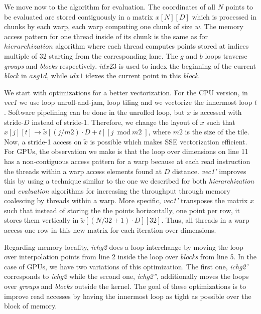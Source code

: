 We move now to the algorithm for evaluation. The coordinates of all $N$ points
to be evaluated are stored contiguously in a matrix $x[N][D]$ which is processed
in chunks by each warp, each warp computing one chunk of size $w$. The memory
access pattern for one thread inside of its chunk is the same as for
$hierarchization$ algorithm where each thread computes points stored at indices
multiple of 32 starting from the corresponding lane. The $g$ and $b$ loops
traverse \textit{groups} and \textit{blocks} respectively. $\textit{idx23}$ is
used to index the beginning of the current \textit{block} in $\textit{asg1d}$,
while $idx1$ idexes the current point in this \textit{block}.

We start with optimizations for a better vectorization. For the CPU version,
in \textit{vec1} we use loop unroll-and-jam, loop tiling and we vectorize the
innermost loop $t$. Software pipelining can be done in the unrolled loop, but
$x$ is accessed with stride-$D$ instead of stride-1. Therefore, we change the
layout of $x$ such that $x[j][t] \rightarrow \tilde{x}[(j/\textit{m2}) \cdot D +
t][j \bmod \textit{m2}]$, where $\textit{m2}$ is the size of the tile. Now, a
stride-1 access on $\tilde{x}$ is possible which makes SSE vectorization
efficient. For GPUs, the observation we make is that the loop over dimensions on
line 11 has a non-contiguous access pattern for a warp because at each read
instruction the threads within a warp access elements found at $D$ distance.
\textit{vec1'} improves this by using a technique similar to the one we
described for both \textit{hierarchization} and \textit{evaluation} algorithms
for increasing the throughput through memory coalescing by threads within a
warp. More specific, \textit{vec1'} transposes the matrix $x$ such that instead
of storing the the points horizontally, one point per row, it stores them
vertically in $\tilde{x}[(N/32+1) \cdot D][32]$. Thus, all threads in a warp
access one row in this new matrix for each iteration over dimensions.

Regarding memory locality, \textit{ichg2} does a loop interchange by moving the
loop over interpolation points from line 2 inside the loop over \textit{blocks}
from line 5. In the case of GPUs, we have two variations of this optimization.
The first one, \textit{ichg2'} corresponds to \textit{ichg2} while the second
one, \textit{ichg2''}, additionally moves the loops over \textit{groups}
and \textit{blocks} outside the kernel. The goal of these optimizations is to
improve read accesses by having the innermost loop as tight as possible over the
block of memory.

